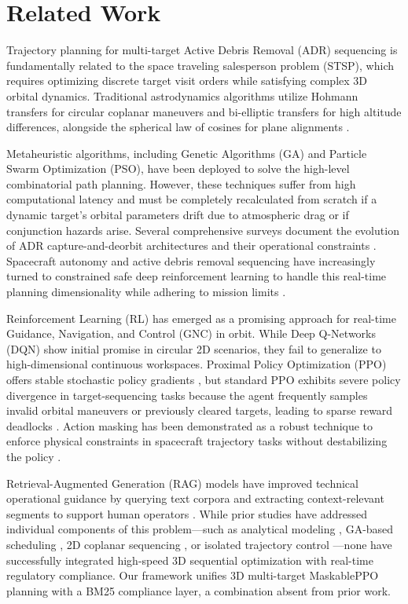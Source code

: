 \documentclass[10pt,conference,a4paper]{IEEEtran}
\begin{document}
\section{Related Work}
Trajectory planning for multi-target Active Debris Removal (ADR) sequencing is fundamentally related to the space traveling salesperson problem (STSP), which requires optimizing discrete target visit orders while satisfying complex 3D orbital dynamics. Traditional astrodynamics algorithms utilize Hohmann transfers for circular coplanar maneuvers and bi-elliptic transfers for high altitude differences, alongside the spherical law of cosines for plane alignments \cite{vallado}.

Metaheuristic algorithms, including Genetic Algorithms (GA) \cite{shenoy} and Particle Swarm Optimization (PSO), have been deployed to solve the high-level combinatorial path planning. However, these techniques suffer from high computational latency and must be completely recalculated from scratch if a dynamic target's orbital parameters drift due to atmospheric drag or if conjunction hazards arise. Several comprehensive surveys document the evolution of ADR capture-and-deorbit architectures and their operational constraints \cite{bonnal2013, shan2016}. Spacecraft autonomy and active debris removal sequencing have increasingly turned to constrained safe deep reinforcement learning to handle this real-time planning dimensionality while adhering to mission limits \cite{capra2022, yuan2022, safeRL}.

Reinforcement Learning (RL) has emerged as a promising approach for real-time Guidance, Navigation, and Control (GNC) in orbit. While Deep Q-Networks (DQN) show initial promise in circular 2D scenarios, they fail to generalize to high-dimensional continuous workspaces. Proximal Policy Optimization (PPO) offers stable stochastic policy gradients \cite{stable-baselines}, but standard PPO exhibits severe policy divergence in target-sequencing tasks because the agent frequently samples invalid orbital maneuvers or previously cleared targets, leading to sparse reward deadlocks \cite{wang}. Action masking has been demonstrated as a robust technique to enforce physical constraints in spacecraft trajectory tasks without destabilizing the policy \cite{capra2022}.

Retrieval-Augmented Generation (RAG) models have improved technical operational guidance by querying text corpora and extracting context-relevant segments to support human operators \cite{rag, gao2023rag}. While prior studies have addressed individual components of this problem---such as analytical modeling \cite{kessler}, GA-based scheduling \cite{shenoy}, 2D coplanar sequencing \cite{wang}, or isolated trajectory control \cite{petropoulos, federici, lafarge}---none have successfully integrated high-speed 3D sequential optimization with real-time regulatory compliance. Our framework unifies 3D multi-target MaskablePPO planning with a BM25 compliance layer, a combination absent from prior work.
\end{document}
